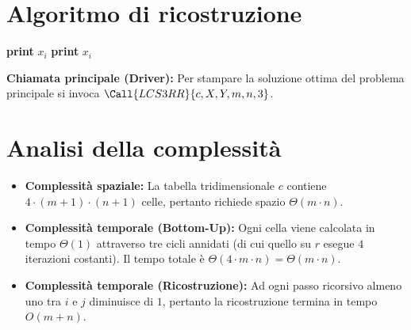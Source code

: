 \section{Algoritmo di ricostruzione}
\begin{algorithm}[htbp]
\caption{Ricostruzione della sequenza LCS con al massimo 3 rossi}
\begin{algorithmic}[1]
        \State \Return
    \Else
                \State {}
            \Else
                \State {}
            \EndIf
        \Else
                \State {}
                \State \textbf{print} $x_i$
            \Else
                    \State {}
                \Else
                        \State {}
                        \State \textbf{print} $x_i$
                    \Else
                        \State {}
                    \EndIf
                \EndIf
            \EndIf
        \EndIf
    \EndIf
\EndProcedure
\end{algorithmic}
\end{algorithm}

\noindent
\textbf{Chiamata principale (Driver):} Per stampare la soluzione ottima del problema principale si invoca $\Call{LCS3RR}{c, X, Y, m, n, 3}$.

\section{Analisi della complessità}
\begin{itemize}
    \item \textbf{Complessità spaziale:} La tabella tridimensionale $c$ contiene $4 \cdot (m+1) \cdot (n+1)$ celle, pertanto richiede spazio $\Theta(m \cdot n)$.
    \item \textbf{Complessità temporale (Bottom-Up):} Ogni cella viene calcolata in tempo $\Theta(1)$ attraverso tre cicli annidati (di cui quello su $r$ esegue $4$ iterazioni costanti). Il tempo totale è $\Theta(4 \cdot m \cdot n) = \Theta(m \cdot n)$.
    \item \textbf{Complessità temporale (Ricostruzione):} Ad ogni passo ricorsivo almeno uno tra $i$ e $j$ diminuisce di $1$, pertanto la ricostruzione termina in tempo $O(m + n)$.
\end{itemize}